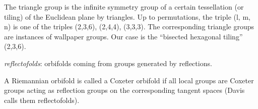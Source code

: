 \begin{description}
The triangle group is the infinite symmetry group of a certain
tessellation (or tiling) of the Euclidean plane by triangles. Up to
permutations, the triple (l, m, n) is one of the triples (2,3,6),
(2,4,4), (3,3,3). The corresponding triangle groups are instances of
wallpaper groups. Our case is the ``bisected hexagonal tiling'' (2,3,6).

%
{\em reflectofolds}: orbifolds coming from groups generated by reflections.

%
A Riemannian orbifold is called a Coxeter orbifold if all local groups
are Coxeter groups acting as reflection groups on the corresponding
tangent spaces (Davis calls them reflectofolds).






\end{description}
